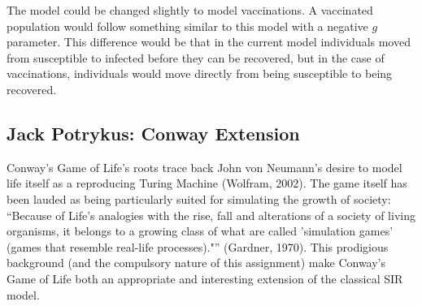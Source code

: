 \documentclass[twoside]{extarticle}                                    %
\numberwithin{equation}{section}                                       %
\begin{document}
The model could be changed slightly to model vaccinations. A vaccinated population would follow something similar to this model with a negative $g$ parameter. This difference would be that in the current model individuals moved from susceptible to infected before they can be recovered, but in the case of vaccinations, individuals would move directly from being susceptible to being recovered.


\subsection{Jack Potrykus: Conway Extension}
Conway's Game of Life's roots trace back John von Neumann's desire to model life itself as a reproducing Turing Machine (Wolfram, 2002). The game itself has been lauded as being particularly suited for simulating the growth of society: ``Because of Life's analogies with the rise, fall and alterations of a society of living organisms, it belongs to a growing class of what are called 'simulation games' (games that resemble real-life processes)."'' (Gardner, 1970). This prodigious background (and the compulsory nature of this assignment) make Conway's Game of Life both an appropriate and interesting extension of the classical SIR model.
\end{document}
